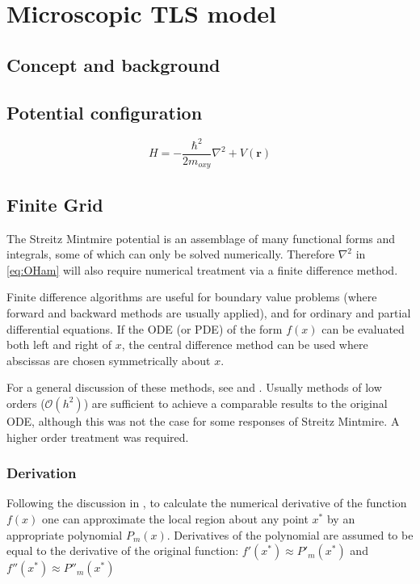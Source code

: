 \chapter{Microscopic TLS model}
\section{Concept and background}
\section{Potential configuration}


\begin{equation}
    H = -\frac{\hbar^2}{2m_{oxy}}\nabla^2+V(\mathbf{r})
    \label{eq:OHam}
\end{equation}


\section{Finite Grid}
The Streitz Mintmire potential \cite{Streitz1994} is an assemblage of many functional forms and integrals, some of which can only be solved numerically. Therefore $\nabla^2$ in \cref{eq:OHam} will also require numerical treatment via a finite difference method. 

Finite difference algorithms are useful for boundary value problems (where forward and backward methods are usually applied), and for ordinary and partial differential equations. If the ODE (or PDE) of the form $f(x)$ can be evaluated both left and right of $x$, the central difference method can be used where abscissas are chosen symmetrically about $x$.
  
For a general discussion of these methods, see  and . Usually methods of low orders (\eg $\mathcal{O}(h^2)$) are sufficient to achieve a comparable results to the original ODE, although this was not the case for some responses of Streitz Mintmire. A higher order treatment was required.

\subsection{Derivation}
Following the discussion in , to calculate the numerical derivative of the function $f(x)$ one can approximate the local region about any point $x^*$ by an appropriate polynomial $P_m(x)$. Derivatives of the polynomial are assumed to be equal to the derivative of the original function: $f'(x^*)\approx P'_m(x^*)$ and $f''(x^*)\approx P''_m(x^*)$ \etc



